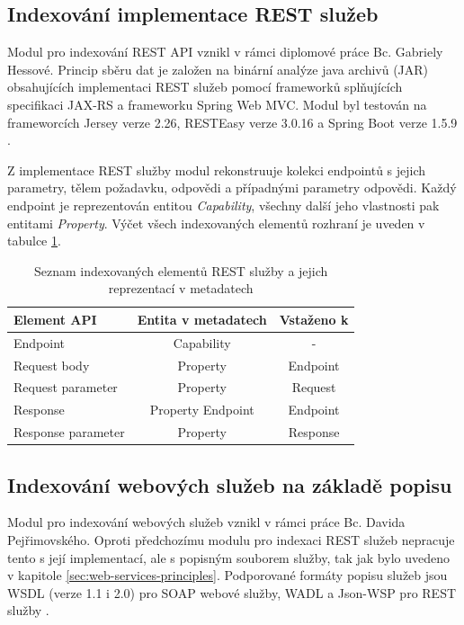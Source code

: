 \documentclass[czech,DP]{thesiskiv}
\begin{document}
\subsection{Indexování implementace REST služeb}

Modul pro indexování REST API vznikl v rámci diplomové práce Bc. Gabriely Hessové. Princip sběru dat je založen na binární analýze java archivů (JAR) obsahujících implementaci REST služeb pomocí frameworků splňujících specifikaci JAX-RS a frameworku Spring Web MVC. Modul byl testován na frameworcích Jersey verze 2.26, RESTEasy verze 3.0.16 a  Spring Boot verze 1.5.9 \cite{hessova2015rest}.

Z implementace REST služby modul rekonstruuje kolekci endpointů s jejich parametry, tělem požadavku, odpovědi a případnými parametry odpovědi. Každý endpoint je reprezentován entitou \textit{Capability}, všechny další jeho vlastnosti pak entitami \textit{Property}. Výčet všech indexovaných elementů rozhraní je uveden v tabulce \ref{tab:rest-indexed}.

\begin{table}[h]
	\centering
	\begin{tabular}{|l | c | c |}
		\hline
		Element API & Entita v metadatech & Vstaženo k\\
		\hline
		\hline
		Endpoint & Capability & - \\
		\hline
		Request body & Property & Endpoint \\
		\hline
		Request parameter & Property & Request \\
		\hline
		Response & Property Endpoint & Endpoint \\
		\hline
		Response parameter & Property & Response \\
		\hline
	\end{tabular}
	\caption{Seznam indexovaných elementů REST služby a jejich reprezentací v metadatech}
	\label{tab:rest-indexed}
\end{table}

\subsection{Indexování webových služeb na základě popisu}

Modul pro indexování webových služeb vznikl v rámci práce Bc. Davida Pejřimovského. Oproti předchozímu modulu pro indexaci REST služeb nepracuje tento s její implementací, ale s popisným souborem služby, tak jak bylo uvedeno v kapitole \ref{sec:web-services-principles}. Podporované formáty popisu služeb jsou WSDL (verze 1.1 i 2.0) pro SOAP webové služby, WADL a Json-WSP pro REST služby \cite{pejrimovsky2015ws}.
\end{document}
